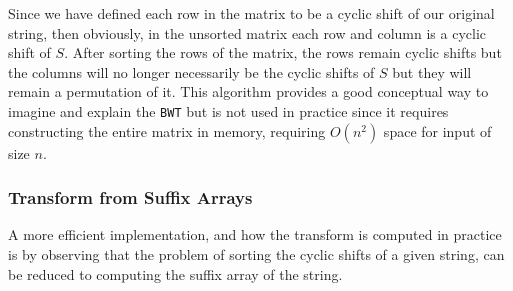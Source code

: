 \documentclass{article}
\begin{document}
Since we have defined each row in the matrix to be a cyclic shift of our original string, then obviously, in the unsorted matrix each row and column is a cyclic shift of \(S\). After sorting the rows of the matrix, the rows remain cyclic shifts but the columns will no longer necessarily be the cyclic shifts of \(S\) but they will remain a permutation of it. %
This algorithm provides a good conceptual way to imagine and explain the \texttt{BWT} but is not used in practice since it requires constructing the entire matrix in memory, requiring \(O(n^2)\) space for input of size \(n\).

\subsubsection{Transform from Suffix Arrays} %
A more efficient implementation, and how the transform is computed in practice is by observing that the problem of sorting the cyclic shifts of a given string, can be reduced to computing the suffix array of the string. 
\end{document}
